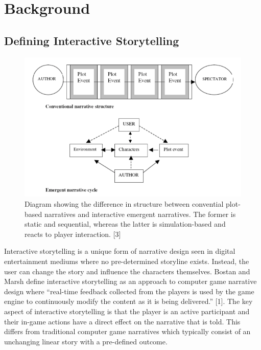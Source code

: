 \documentclass{sig-alternate-05-2015}
\begin{document}


\section{Background}

\subsection{Defining Interactive Storytelling}

\begin{figure}
\centering
\includegraphics[scale=0.3]{Images/PlotVsEmergent.png}
\caption{Diagram showing the difference in structure between convential plot-based narratives and interactive emergent narratives. The former is static and sequential, whereas the latter is simulation-based and reacts to player interaction. [3]}
\label{fig:PlotVsEmergent}
\end{figure}

Interactive storytelling is a unique form of narrative design seen in digital entertainment mediums where no pre-determined storyline exists. Instead, the user can change the story and influence the characters themselves. Bostan and Marsh define interactive storytelling as an approach to computer game narrative design where ``real-time feedback collected from the players is used by the game engine to continuously modify the content as it is being delivered.'' [1]. The key aspect of interactive storytelling is that the player is an active participant and their in-game actions have a direct effect on the narrative that is told. This differs from traditional computer game narratives which typically consist of an unchanging linear story with a pre-defined outcome.
\end{document}

